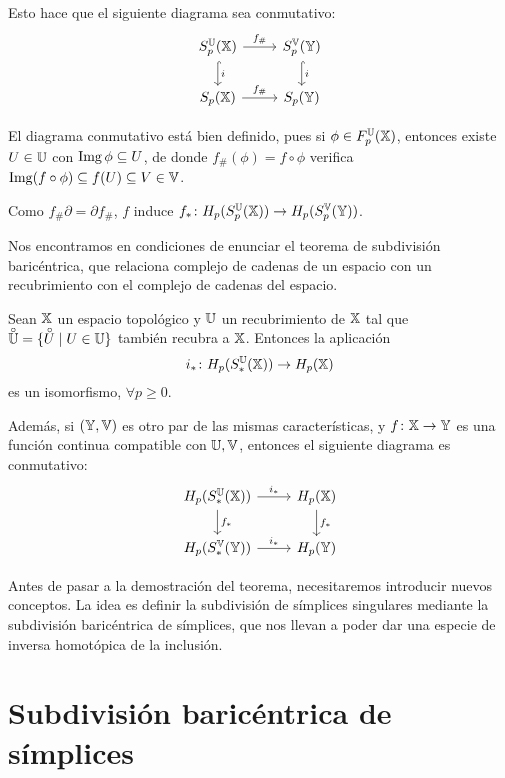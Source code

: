 Esto hace que el siguiente diagrama sea conmutativo:
\[ \begin{tikzcd}
  S_p^\U(\X) \arrow{r}{f_\#} \arrow[hook]{d}{i} & S_p^\V(\Y) \arrow[hook]{d}{i} \\
  \SX{p} \arrow{r}{f_\#} & \SY{p}
\end{tikzcd} \]

\begin{remark}
  El diagrama conmutativo está bien definido, pues si $\phi \in F_p^{\mathbb U}({\mathbb X})$, entonces existe $U \in {\mathbb U}$ con $\operatorname{Img} \phi \subseteq U$, de donde
  $f_\#(\phi) = f \circ \phi$ verifica $\operatorname{Img}(f \circ \phi) \subseteq f(U) \subseteq V \in {\mathbb V}$.
\end{remark}

Como $f_\# \partial = \partial f_\#$, $f$ induce $f_* \colon H_p(S_p^{\mathbb U}({\mathbb X})) \to H_p(S_p^{\mathbb V}({\mathbb Y}))$.

Nos encontramos en condiciones de enunciar el teorema de subdivisión baricéntrica, que relaciona complejo de cadenas
de un espacio con un recubrimiento con el complejo de cadenas del espacio.

\begin{theorem}
  Sean ${\mathbb X}$ un espacio topológico y ${\mathbb U}$ un recubrimiento de ${\mathbb X}$ tal que $\interior{\U} = \{\interior{U} \mid U \in \U\}$
  también recubra a ${\mathbb X}$. Entonces la aplicación
  \[ i_* \colon H_p(S_*^{\mathbb U}({\mathbb X})) \to H_p({\mathbb X}) \]
  es un isomorfismo, $\forall p \geq 0$.

  Además, si $({\mathbb Y}, {\mathbb V})$ es otro par de las mismas características, y $f \colon {\mathbb X} \to {\mathbb Y}$ es una función continua
  compatible con ${\mathbb U}, {\mathbb V}$, entonces el siguiente diagrama es conmutativo:
  \[ \begin{tikzcd}
    H_p(S_*^\U(\X)) \arrow{r}{i_*} \arrow{d}{f_*} & H_p(\X) \arrow{d}{f_*} \\
    H_p(S_*^\V(\Y)) \arrow{r}{i_*} & H_p(\Y)
  \end{tikzcd} \]

\end{theorem}

Antes de pasar a la demostración del teorema, necesitaremos introducir nuevos conceptos. La idea es definir la subdivisión
de símplices singulares mediante la subdivisión baricéntrica de símplices, que nos llevan a poder dar una especie de
inversa homotópica de la inclusión.

\section{Subdivisión baricéntrica de símplices}

